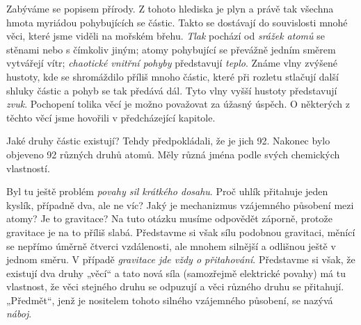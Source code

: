     Zabýváme se popisem přírody. Z tohoto hlediska je plyn a právě tak všechna hmota myriádou
    pohybujících se částic. Takto se dostávají do souvislosti mnohé věci, které jsme viděli na
    mořském břehu. \emph{Tlak} pochází od \emph{srážek atomů} se stěnami nebo s čímkoliv jiným;
    atomy pohybující se převážně jedním směrem vytvářejí vítr; \emph{chaotické vnitřní pohyby}
    představují \emph{teplo}. Známe vlny zvýšené hustoty, kde se shromáždilo příliš mnoho částic,
    které při rozletu stlačují další shluky částic a pohyb se tak předává dál. Tyto vlny vyšší
    hustoty představují \emph{zvuk}. Pochopení tolika věcí je možno považovat za úžasný úspěch. O
    některých z těchto věcí jsme hovořili v předcházející kapitole.
    
    Jaké druhy částic existují? Tehdy předpokládali, že je jich 92. Nakonec bylo objeveno 92 různých
    druhů atomů. Měly různá jména podle svých chemických vlastností.
    
    Byl tu ještě problém \emph{povahy sil krátkého dosahu}. Proč uhlík přitahuje jeden kyslík,
    případně dva, ale ne víc? Jaký je mechanizmus vzájemného působení mezi atomy? Je to gravitace?
    Na tuto otázku musíme odpovědět záporně, protože gravitace je na to příliš slabá. Představme si
    však sílu podobnou gravitaci, měnící se nepřímo úměrně čtverci vzdálenosti, ale mnohem silnější
    a odlišnou ještě v jednom směru. V případě \emph{gravitace jde vždy o přitahování}. Představme
    si však, že existují dva druhy „věcí“ a tato nová síla  (samozřejmě elektrické povahy) má tu
    vlastnost, že věci stejného druhu se odpuzují a věci různého druhu se přitahují. „Předmět“, jenž
    je nositelem tohoto silného vzájemného působení, se nazývá \emph{náboj}.  
    

